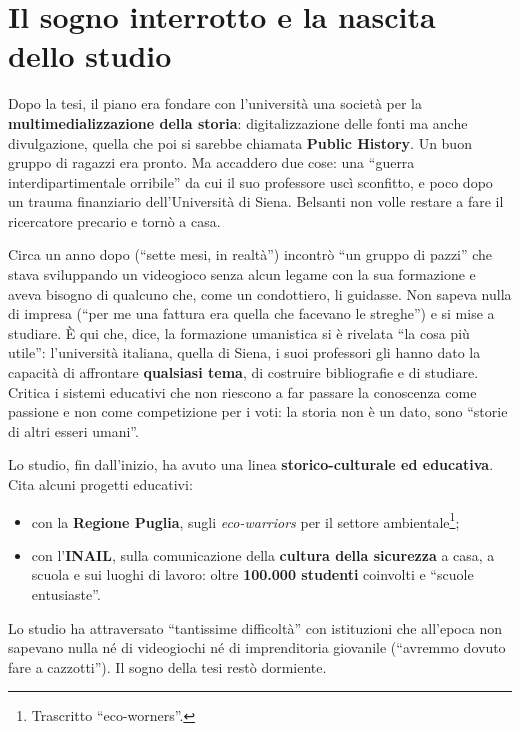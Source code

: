\section{Il sogno interrotto e la nascita dello studio}
\label{sec:c1-2-studio}

Dopo la tesi, il piano era fondare con l'università una società per la
\textbf{multimedializzazione della storia}: digitalizzazione delle fonti ma anche
divulgazione, quella che poi si sarebbe chiamata \textbf{Public History}. Un buon
gruppo di ragazzi era pronto. Ma accaddero due cose: una ``guerra
interdipartimentale orribile'' da cui il suo professore uscì sconfitto, e poco
dopo un trauma finanziario dell'Università di Siena. Belsanti non volle restare
a fare il ricercatore precario e tornò a casa.

Circa un anno dopo (``sette mesi, in realtà'') incontrò ``un gruppo di pazzi''
che stava sviluppando un videogioco senza alcun legame con la sua formazione e
aveva bisogno di qualcuno che, come un condottiero, li guidasse. Non sapeva
nulla di impresa (``per me una fattura era quella che facevano le streghe'') e
si mise a studiare. È qui che, dice, la formazione umanistica si è rivelata ``la
cosa più utile'': l'università italiana, quella di Siena, i suoi professori gli
hanno dato la capacità di affrontare \textbf{qualsiasi tema}, di costruire
bibliografie e di studiare. Critica i sistemi educativi che non riescono a far
passare la conoscenza come passione e non come competizione per i voti: la
storia non è un dato, sono ``storie di altri esseri umani''.

Lo studio, fin dall'inizio, ha avuto una linea \textbf{storico-culturale ed
educativa}. Cita alcuni progetti educativi:
\begin{itemize}
  \item con la \textbf{Regione Puglia}, sugli \emph{eco-warriors} per il settore
        ambientale\footnote{Trascritto ``eco-worners''.};
  \item con l'\textbf{INAIL}, sulla comunicazione della \textbf{cultura della
        sicurezza} a casa, a scuola e sui luoghi di lavoro: oltre
        \textbf{100.000 studenti} coinvolti e ``scuole entusiaste''.
\end{itemize}
Lo studio ha attraversato ``tantissime difficoltà'' con istituzioni che all'epoca
non sapevano nulla né di videogiochi né di imprenditoria giovanile (``avremmo
dovuto fare a cazzotti''). Il sogno della tesi restò dormiente.

